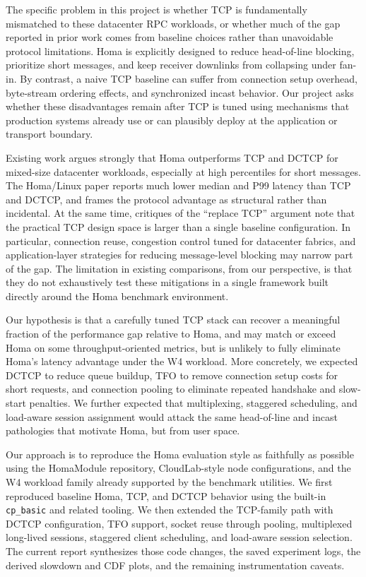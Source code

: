 \documentclass[11pt]{article}
\begin{document}
The specific problem in this project is whether TCP is fundamentally mismatched to these datacenter RPC workloads, or whether much of the gap reported in prior work comes from baseline choices rather than unavoidable protocol limitations. Homa is explicitly designed to reduce head-of-line blocking, prioritize short messages, and keep receiver downlinks from collapsing under fan-in. By contrast, a naive TCP baseline can suffer from connection setup overhead, byte-stream ordering effects, and synchronized incast behavior. Our project asks whether these disadvantages remain after TCP is tuned using mechanisms that production systems already use or can plausibly deploy at the application or transport boundary.

Existing work argues strongly that Homa outperforms TCP and DCTCP for mixed-size datacenter workloads, especially at high percentiles for short messages. The Homa/Linux paper reports much lower median and P99 latency than TCP and DCTCP, and frames the protocol advantage as structural rather than incidental. At the same time, critiques of the ``replace TCP'' argument note that the practical TCP design space is larger than a single baseline configuration. In particular, connection reuse, congestion control tuned for datacenter fabrics, and application-layer strategies for reducing message-level blocking may narrow part of the gap. The limitation in existing comparisons, from our perspective, is that they do not exhaustively test these mitigations in a single framework built directly around the Homa benchmark environment.

Our hypothesis is that a carefully tuned TCP stack can recover a meaningful fraction of the performance gap relative to Homa, and may match or exceed Homa on some throughput-oriented metrics, but is unlikely to fully eliminate Homa's latency advantage under the W4 workload. More concretely, we expected DCTCP to reduce queue buildup, TFO to remove connection setup costs for short requests, and connection pooling to eliminate repeated handshake and slow-start penalties. We further expected that multiplexing, staggered scheduling, and load-aware session assignment would attack the same head-of-line and incast pathologies that motivate Homa, but from user space.

Our approach is to reproduce the Homa evaluation style as faithfully as possible using the HomaModule repository, CloudLab-style node configurations, and the W4 workload family already supported by the benchmark utilities. We first reproduced baseline Homa, TCP, and DCTCP behavior using the built-in \texttt{cp\_basic} and related tooling. We then extended the TCP-family path with DCTCP configuration, TFO support, socket reuse through pooling, multiplexed long-lived sessions, staggered client scheduling, and load-aware session selection. The current report synthesizes those code changes, the saved experiment logs, the derived slowdown and CDF plots, and the remaining instrumentation caveats.
\end{document}
